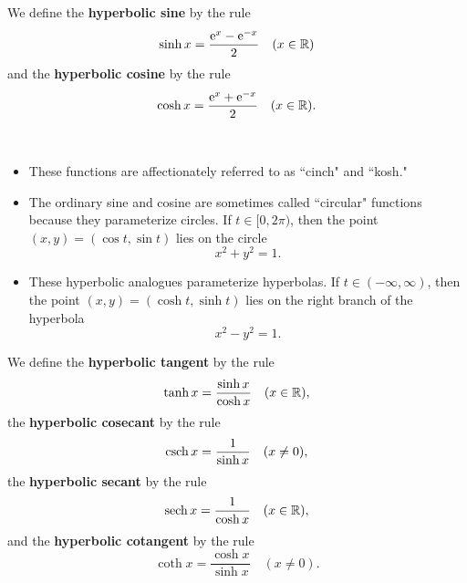 \setcounter{chapter}{7}
\setcounter{section}{7}
\setcounter{theorem}{0}
\setcounter{equation}{0}


\begin{definition}
We define the \textbf{hyperbolic sine} by the rule
\begin{equation*}
\sinh x = \frac{\mathrm{e}^x-\mathrm{e}^{-x}}{2} \quad (x\in\mathbb R)
\end{equation*}
and the \textbf{hyperbolic cosine} by the rule
\begin{equation*}
\cosh x = \frac{\mathrm{e}^x+\mathrm{e}^{-x}}{2} \quad (x\in\mathbb R).
\end{equation*}
\end{definition}

\begin{remark}\,
\begin{itemize}
\item These functions are affectionately referred to as ``cinch" and ``kosh."
\item The ordinary sine and cosine are sometimes called ``circular" functions because they parameterize circles.
If $t\in [0,2\pi)$, then the point $(x,y) = (\cos t, \sin t)$ lies on the circle
\begin{equation*}
x^2+y^2=1.
\end{equation*}
\item These hyperbolic analogues parameterize hyperbolas.
If $t\in (-\infty,\infty)$, then the point $(x,y)=(\cosh t, \sinh t)$ lies on the right branch of the hyperbola
\begin{equation*}
x^2-y^2=1.
\end{equation*}
\end{itemize}
\end{remark}

\begin{definition}
We define the \textbf{hyperbolic tangent} by the rule
\begin{equation*}
\tanh x = \frac{\sinh x}{\cosh x} \quad (x\in \mathbb R),
\end{equation*}
the \textbf{hyperbolic cosecant} by the rule
\begin{equation*}
\operatorname{csch} x = \frac{1}{\sinh x} \quad (x\ne 0),
\end{equation*}
the \textbf{hyperbolic secant} by the rule
\begin{equation*}
\operatorname{sech} x = \frac{1}{\cosh x} \quad (x\in\mathbb R),
\end{equation*}
and the \textbf{hyperbolic cotangent} by the rule
\begin{equation*}
\coth x = \frac{\cosh x}{\sinh x} \quad (x\ne 0).
\end{equation*}
\end{definition}

